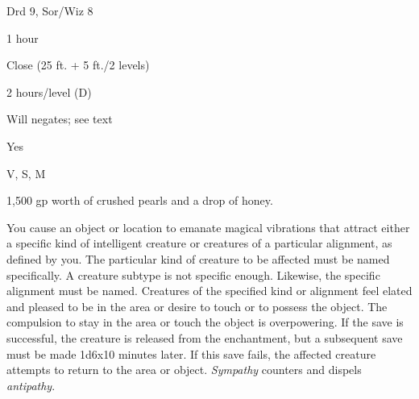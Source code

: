 
\begin{description*}
\item[Level:] Drd 9, Sor/Wiz 8
\item[Casting Time:] 1 hour
\item[Range:] Close (25 ft. + 5 ft./2 levels)
\item[Duration:] 2 hours/level (D)
\item[Saving Throw:] Will negates; see text
\item[Spell Resistance:] Yes
\item[Components:] V, S, M
\item[Arcane Material Component:] 1,500 gp worth of crushed pearls and a drop of honey.
\end{description*}

You cause an object or location to emanate magical vibrations that attract either
a specific kind of intelligent creature or creatures of a particular alignment,
as defined by you. The particular kind of creature to be affected must be named
specifically. A creature subtype is not specific enough. Likewise, the specific
alignment must be named.
Creatures of the specified kind or alignment feel elated and pleased to be in the
area or desire to touch or to possess the object. The compulsion to stay in the
area or touch the object is overpowering. If the save is successful, the creature
is released from the enchantment, but a subsequent save must be made 1d6x10 minutes
later. If this save fails, the affected creature attempts to return to the area
or object.
\textit{Sympathy} counters and dispels \textit{antipathy}.